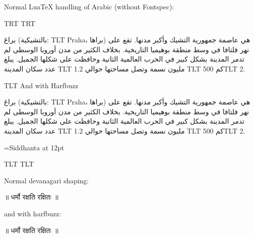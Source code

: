 \documentclass{article}
\newcommand\textlatin[1]{\bgroup\luatextextdir TLT #1\egroup}
\begin{document}
\arab 

Normal LuaTeX handling of Arabic (without Fontspec):

\luatextextdir TRT
\luatexpardir TRT

براغ (بالتشيكية: \textlatin{Praha}، براها) هي عاصمة جمهورية التشيك وأكبر مدنها. تقع على نهر فلتافا في وسط منطقة بوهيميا التاريخية. بخلاف الكثير من مدن أوروبا الوسطى لم تدمر المدينة بشكل كبير في الحرب العالمية الثانية وحافظت على شكلها الجميل. يبلغ عدد سكان المدينة \textlatin{1.2} مليون نسمة وتصل مساحتها حوالي \textlatin{500} كم\textlatin{2.}

\startharfbuzz

\textlatin{And with Harfbuzz}

براغ (بالتشيكية: \textlatin{Praha}، براها) هي عاصمة جمهورية التشيك وأكبر مدنها. تقع على نهر فلتافا في وسط منطقة بوهيميا التاريخية. بخلاف الكثير من مدن أوروبا الوسطى لم تدمر المدينة بشكل كبير في الحرب العالمية الثانية وحافظت على شكلها الجميل. يبلغ عدد سكان المدينة \textlatin{1.2} مليون نسمة وتصل مساحتها حوالي \textlatin{500} كم\textlatin{2.}


\font\siddhanta={Siddhanta} at 12pt
\bigskip

\siddhanta 

\stopharfbuzz
\luatextextdir TLT
\luatexpardir TLT

Normal devanagari shaping: 

॥ धर्मो रक्षति रक्षितः ॥

\startharfbuzz

and with harfbuzz: 


॥ धर्मो रक्षति रक्षितः ॥
\end{document}
